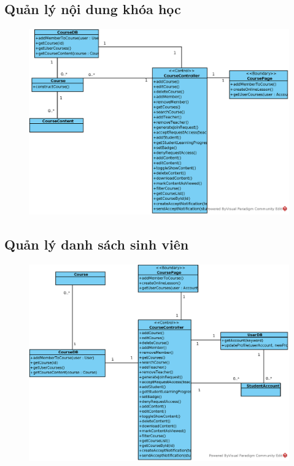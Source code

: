 \documentclass[./../main_file.tex]{subfiles}
\begin{document}
\subsection{Quản lý nội dung khóa học}
\begin{figure}[H]
	\centering
	\includegraphics[width=\linewidth]{./images/define_operations/ucd_method_manage_contentcourse.eps}
\end{figure}
\subsection{Quản lý danh sách sinh viên}
\begin{figure}[H]
	\centering
	\includegraphics[width=\linewidth]{./images/define_operations/ucd_method_add_course_mem.eps}
\end{figure}
\end{document}
